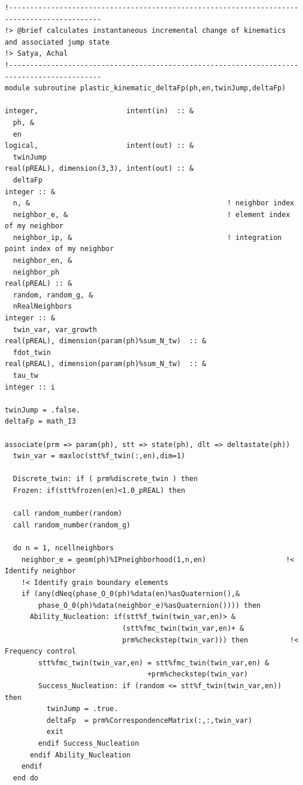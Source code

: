 \begin{verbatim}
!--------------------------------------------------------------------------------------------
!> @brief calculates instantaneous incremental change of kinematics and associated jump state
!> Satya, Achal
!--------------------------------------------------------------------------------------------
module subroutine plastic_kinematic_deltaFp(ph,en,twinJump,deltaFp)

integer,                     intent(in)  :: &
  ph, &
  en
logical,                     intent(out) :: &
  twinJump
real(pREAL), dimension(3,3), intent(out) :: &
  deltaFp  
integer :: &
  n, &                                               ! neighbor index
  neighbor_e, &                                      ! element index of my neighbor
  neighbor_ip, &                                     ! integration point index of my neighbor
  neighbor_en, &
  neighbor_ph
real(pREAL) :: &
  random, random_g, &
  nRealNeighbors
integer :: &
  twin_var, var_growth
real(pREAL), dimension(param(ph)%sum_N_tw)  :: &
  fdot_twin
real(pREAL), dimension(param(ph)%sum_N_tw)  :: &
  tau_tw
integer :: i

twinJump = .false.
deltaFp = math_I3
  
associate(prm => param(ph), stt => state(ph), dlt => deltastate(ph))
  twin_var = maxloc(stt%f_twin(:,en),dim=1)

  Discrete_twin: if ( prm%discrete_twin ) then
  Frozen: if(stt%frozen(en)<1.0_pREAL) then
    
  call random_number(random)
  call random_number(random_g)
    
  do n = 1, ncellneighbors
    neighbor_e = geom(ph)%IPneighborhood(1,n,en)                   !< Identify neighbor
    !< Identify grain boundary elements
    if (any(dNeq(phase_O_0(ph)%data(en)%asQuaternion(),&
        phase_O_0(ph)%data(neighbor_e)%asQuaternion()))) then       
      Ability_Nucleation: if(stt%f_twin(twin_var,en)> &
                            (stt%fmc_twin(twin_var,en)+ &
                            prm%checkstep(twin_var))) then          !< Frequency control
        stt%fmc_twin(twin_var,en) = stt%fmc_twin(twin_var,en) &
                                  +prm%checkstep(twin_var)
        Success_Nucleation: if (random <= stt%f_twin(twin_var,en)) then          
          twinJump = .true.
          deltaFp  = prm%CorrespondenceMatrix(:,:,twin_var)
          exit
        endif Success_Nucleation
      endif Ability_Nucleation
    endif
  end do


\end{verbatim}
